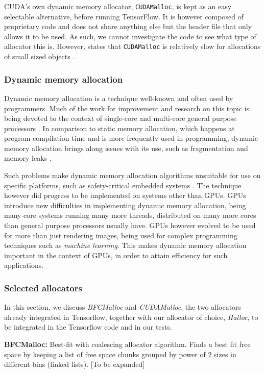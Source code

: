 \documentclass[12pt,twoside]{article}
\begin{document}
CUDA's own dynamic memory allocator, \texttt{CUDAMalloc}, is kept as an easy selectable alternative, before running TensorFlow. It is however composed of proprietary code and does not share anything else but the header file that only allows it to be used. As such, we cannot investigate the code to see what type of allocator this is. However, \citeauthor{Vinkler2015} states that \texttt{CUDAMalloc} is relatively slow for allocations of small sized objects \cite{Vinkler2015}.

\subsubsection*{Dynamic memory allocation}

Dynamic memory allocation is a technique well-known and often used by programmers. Much of the work for improvement and research on this topic is being devoted to the context of single-core and multi-core general purpose processors \cite{YOU2015}. In comparison to static memory allocation, which happens at program compilation time and is more frequently used in programming, dynamic memory allocation brings along issues with its use, such as fragmentation and memory leaks \cite{TRAISTER199099}.

Such problems make dynamic memory allocation algorithms unsuitable for use on specific platforms, such as safety-critical embedded systems \cite{Puaut_2002}. The technique however did progress to be implemented on systems other than GPUs. GPUs introduce new difficulties in implementing dynamic memory allocation, being many-core systems running many more threads, distributed on many more cores than general purpose processors usually have. GPUs however evolved to be used for more than just rendering images, being used for complex programming techniques such as \textit{machine learning}. This makes dynamic memory allocation important in the context of GPUs, in order to attain efficiency for such applications.

\subsubsection*{Selected allocators}

In this section, we discuss \textit{BFCMalloc} and \textit{CUDAMalloc}, the two allocators already integrated in Tensorflow, together with our allocator of choice, \textit{Halloc}, to be integrated in the Tensorflow code and in our tests.

\textbf{BFCMalloc:} Best-fit with coalescing allocator algorithm. Finds a best fit free space by keeping a list of free space chunks grouped by power of 2 sizes in different bins (linked lists).
[To be expanded]
\end{document}
